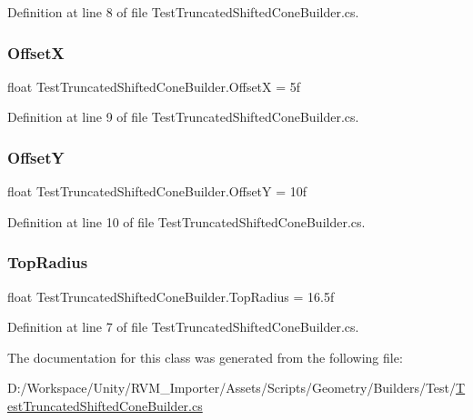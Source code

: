 Definition at line 8 of file Test\+Truncated\+Shifted\+Cone\+Builder.\+cs.

\mbox{\label{class_test_truncated_shifted_cone_builder_a4120d5f26a5b334544ab422c17b0088c}} 
\subsubsection{\texorpdfstring{OffsetX}{OffsetX}}
{\footnotesize\ttfamily float Test\+Truncated\+Shifted\+Cone\+Builder.\+OffsetX = 5f}



Definition at line 9 of file Test\+Truncated\+Shifted\+Cone\+Builder.\+cs.

\mbox{\label{class_test_truncated_shifted_cone_builder_aec0ce8360ff6d59808f24b0a9f08c970}} 
\subsubsection{\texorpdfstring{OffsetY}{OffsetY}}
{\footnotesize\ttfamily float Test\+Truncated\+Shifted\+Cone\+Builder.\+OffsetY = 10f}



Definition at line 10 of file Test\+Truncated\+Shifted\+Cone\+Builder.\+cs.

\mbox{\label{class_test_truncated_shifted_cone_builder_a709530aa60aebe3a91631cfa70ad4519}} 
\subsubsection{\texorpdfstring{TopRadius}{TopRadius}}
{\footnotesize\ttfamily float Test\+Truncated\+Shifted\+Cone\+Builder.\+Top\+Radius = 16.\+5f}



Definition at line 7 of file Test\+Truncated\+Shifted\+Cone\+Builder.\+cs.



The documentation for this class was generated from the following file\+:\begin{DoxyCompactItemize}
\item 
D\+:/\+Workspace/\+Unity/\+R\+V\+M\+\_\+\+Importer/\+Assets/\+Scripts/\+Geometry/\+Builders/\+Test/\mbox{\hyperlink{_test_truncated_shifted_cone_builder_8cs}{Test\+Truncated\+Shifted\+Cone\+Builder.\+cs}}\end{DoxyCompactItemize}
